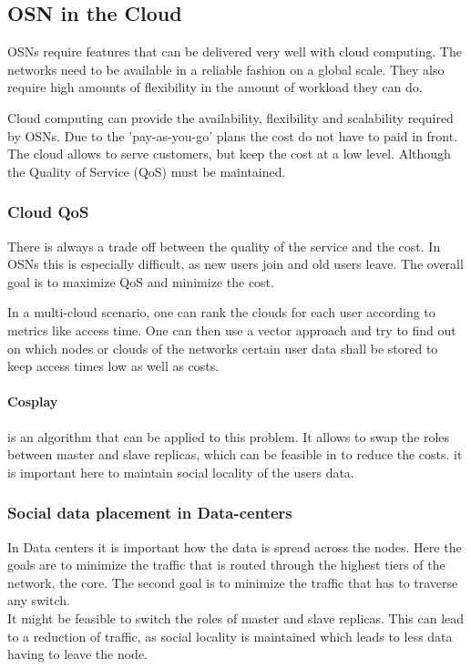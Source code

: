 \subsection{OSN in the Cloud} %
\label{sub:osn_in_the_cloud}
OSNs require features that can be delivered very well with cloud computing.
The networks need to be available in a reliable fashion
on a global scale.
They also require high amounts of flexibility in the amount of workload they can do.

Cloud computing can provide the availability, flexibility and scalability required by OSNs.
Due to the 'pay-as-you-go' plans the cost do not have to paid in front.
The cloud allows to serve customers,
but keep the cost at a low level.
Although the Quality of Service (QoS) must be maintained.

\subsubsection{Cloud QoS} %
\label{ssub:cloud_qos}
There is always a trade off between the quality of the service and the cost.
In OSNs this is especially difficult,
as new users join and old users leave.
The overall goal is to maximize QoS and minimize the cost.

In a multi-cloud scenario,
one can rank the clouds for each user according to metrics like access time.
One can then use a vector approach and try to find out on which nodes or clouds of the networks
certain user data shall be stored to keep access times low as well as costs.

\paragraph{Cosplay} %
\label{par:cosplay}
is an algorithm that can be applied to this problem.
It allows to swap the roles between master and slave replicas,
which can be feasible in to reduce the costs.
it is important here to maintain social locality of the users data.

\subsubsection{Social data placement in Data-centers} %
\label{ssub:social_data_placement_in_datacenters}
In Data centers it is important how the data is spread across the nodes.
Here the goals are to minimize the traffic that is routed through the highest tiers of the network,
the core.
The second goal is to minimize the traffic that has to traverse any switch.\\
It might be feasible to switch the roles of master and slave replicas.
This can lead to a reduction of traffic,
as social locality is maintained which leads to less data having to leave the node.
